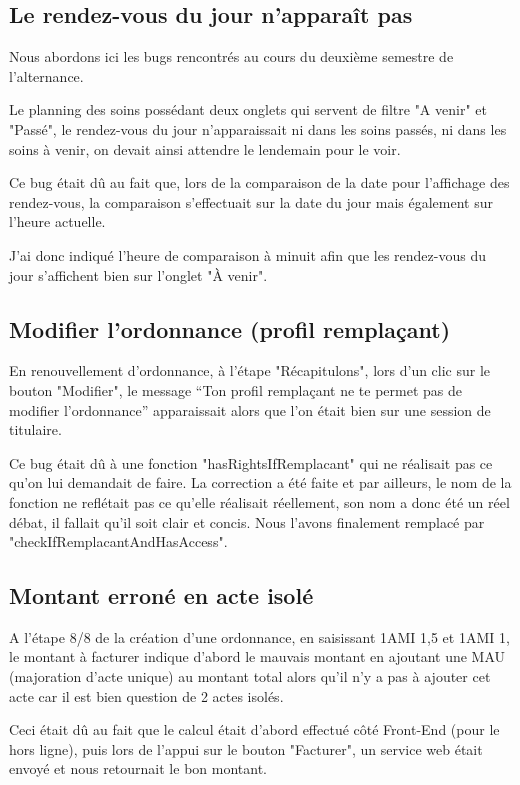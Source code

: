 \documentclass{article}
\begin{document}
\subsection{Le rendez-vous du jour n'apparaît pas}
Nous abordons ici les bugs rencontrés au cours du deuxième semestre de l'alternance.

Le planning des soins possédant deux onglets qui servent de filtre "A venir" et "Passé", le rendez-vous du jour n'apparaissait ni dans les soins passés, ni dans les soins à venir, on devait ainsi attendre le lendemain pour le voir.

Ce bug était dû au fait que, lors de la comparaison de la date pour l'affichage des rendez-vous, la comparaison s'effectuait sur la date du jour mais également sur l'heure actuelle.

J'ai donc indiqué l'heure de comparaison à minuit afin que les rendez-vous du jour s'affichent bien sur l'onglet "À venir".

\subsection{Modifier l'ordonnance (profil remplaçant)}

En renouvellement d'ordonnance, à l'étape "Récapitulons", lors d'un clic sur le bouton "Modifier", le message “Ton profil remplaçant ne te permet pas de modifier l'ordonnance” apparaissait alors que l'on était bien sur une session de titulaire.

Ce bug était dû à une fonction "hasRightsIfRemplacant" qui ne réalisait pas ce qu'on lui demandait de faire. La correction a été faite et par ailleurs, le nom de la fonction ne reflétait pas ce qu'elle réalisait réellement, son nom a donc été un réel débat, il fallait qu'il soit clair et concis. Nous l'avons finalement remplacé par "checkIfRemplacantAndHasAccess".

\subsection{Montant erroné en acte isolé}

A l'étape 8/8 de la création d'une ordonnance, en saisissant 1AMI 1,5 et 1AMI 1, le montant à facturer indique d'abord le mauvais montant en ajoutant une MAU (majoration d'acte unique) au montant total alors qu'il n'y a pas à ajouter cet acte car il est bien question de 2 actes isolés.

Ceci était dû au fait que le calcul était d'abord effectué côté Front-End (pour le hors ligne), puis lors de l'appui sur le bouton "Facturer", un service web était envoyé et nous retournait le bon montant.
\end{document}
